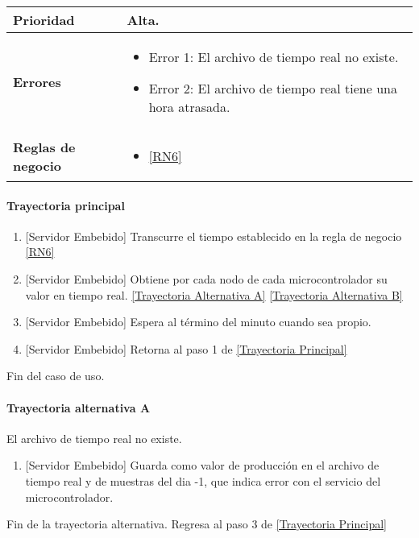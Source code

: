 \begin{longtable}{|J{5cm}|J{10.3cm}|}
	\textbf{Prioridad} & 
		Alta. \\ \hline
	\textbf{Errores} &
		 \begin{itemize}
		 	\item \label{SUB-M-CU1.5:Error1} Error 1: El archivo de tiempo real no existe.
		 	\item \label{SUB-M-CU1.5:Error2} Error 2: El archivo de tiempo real tiene una hora atrasada.
		 \end{itemize} \\ \hline
	\textbf{Reglas de negocio} & 
	    \begin{itemize}
	      \item  \ref{RN6}
		 \end{itemize}\\ \hline
\end{longtable}

\paragraph{Trayectoria principal}
\label{SUB-M-CU1.5:TP}
	\begin{enumerate}
	    \item {[Servidor Embebido]} Transcurre el tiempo establecido en la regla de negocio \ref{RN6}
	    \item {[Servidor Embebido]} Obtiene por cada nodo de cada microcontrolador su valor en tiempo real. \hyperref[SUB-M-CU1.5:TB]{[Trayectoria Alternativa A]} \hyperref[SUB-M-CU1.5:TB]{[Trayectoria Alternativa B]}
	    \item {[Servidor Embebido]} Espera al término del minuto cuando sea propio.
		\item {[Servidor Embebido]} Retorna al paso 1 de \hyperref[SUB-M-CU1.5:TP]{[Trayectoria Principal]}
	\end{enumerate}
	Fin del caso de uso.

\paragraph{Trayectoria alternativa A} \label{SUB-M-CU1.5:TA}
	El archivo de tiempo real no existe.
	\begin{enumerate}[label=A\arabic*.]
		\item {[Servidor Embebido]} Guarda como valor de producción en el archivo de tiempo real y de muestras del dia -1, que indica error con el servicio del microcontrolador.
	\end{enumerate}
	Fin de la trayectoria alternativa. Regresa al paso 3 de \hyperref[SUB-M-CU1.5:TP]{[Trayectoria Principal]}  


